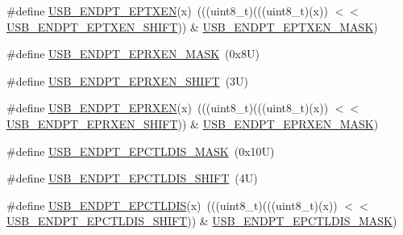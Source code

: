 \begin{DoxyCompactItemize}
\item 
\#define \mbox{\hyperlink{group___u_s_b___register___masks_gae2e26d86dd1195cd8536e873faa1c5e7}{U\+S\+B\+\_\+\+E\+N\+D\+P\+T\+\_\+\+E\+P\+T\+X\+EN}}(x)~(((uint8\+\_\+t)(((uint8\+\_\+t)(x)) $<$$<$ \mbox{\hyperlink{group___u_s_b___register___masks_gad281aa3cd601a2a93f60e0145dd8e564}{U\+S\+B\+\_\+\+E\+N\+D\+P\+T\+\_\+\+E\+P\+T\+X\+E\+N\+\_\+\+S\+H\+I\+FT}})) \& \mbox{\hyperlink{group___u_s_b___register___masks_ga3d498f31497071c5ff6ad30e89b7c26e}{U\+S\+B\+\_\+\+E\+N\+D\+P\+T\+\_\+\+E\+P\+T\+X\+E\+N\+\_\+\+M\+A\+SK}})
\item 
\#define \mbox{\hyperlink{group___u_s_b___register___masks_ga80f33455bd11aa0be5cd5d876ab48228}{U\+S\+B\+\_\+\+E\+N\+D\+P\+T\+\_\+\+E\+P\+R\+X\+E\+N\+\_\+\+M\+A\+SK}}~(0x8\+U)
\item 
\#define \mbox{\hyperlink{group___u_s_b___register___masks_gaeba041e492aca9bfbdbc90584e00cba9}{U\+S\+B\+\_\+\+E\+N\+D\+P\+T\+\_\+\+E\+P\+R\+X\+E\+N\+\_\+\+S\+H\+I\+FT}}~(3\+U)
\item 
\#define \mbox{\hyperlink{group___u_s_b___register___masks_ga88daead6b23836beafb0da6aead51fac}{U\+S\+B\+\_\+\+E\+N\+D\+P\+T\+\_\+\+E\+P\+R\+X\+EN}}(x)~(((uint8\+\_\+t)(((uint8\+\_\+t)(x)) $<$$<$ \mbox{\hyperlink{group___u_s_b___register___masks_gaeba041e492aca9bfbdbc90584e00cba9}{U\+S\+B\+\_\+\+E\+N\+D\+P\+T\+\_\+\+E\+P\+R\+X\+E\+N\+\_\+\+S\+H\+I\+FT}})) \& \mbox{\hyperlink{group___u_s_b___register___masks_ga80f33455bd11aa0be5cd5d876ab48228}{U\+S\+B\+\_\+\+E\+N\+D\+P\+T\+\_\+\+E\+P\+R\+X\+E\+N\+\_\+\+M\+A\+SK}})
\item 
\#define \mbox{\hyperlink{group___u_s_b___register___masks_ga07f43f2be7e974a763e86087f47e14d6}{U\+S\+B\+\_\+\+E\+N\+D\+P\+T\+\_\+\+E\+P\+C\+T\+L\+D\+I\+S\+\_\+\+M\+A\+SK}}~(0x10\+U)
\item 
\#define \mbox{\hyperlink{group___u_s_b___register___masks_ga0607b1ed419fd16c0c3635042ff33fd4}{U\+S\+B\+\_\+\+E\+N\+D\+P\+T\+\_\+\+E\+P\+C\+T\+L\+D\+I\+S\+\_\+\+S\+H\+I\+FT}}~(4\+U)
\item 
\#define \mbox{\hyperlink{group___u_s_b___register___masks_gacf7f8e35ddc1367ac4069ef47ccdd448}{U\+S\+B\+\_\+\+E\+N\+D\+P\+T\+\_\+\+E\+P\+C\+T\+L\+D\+IS}}(x)~(((uint8\+\_\+t)(((uint8\+\_\+t)(x)) $<$$<$ \mbox{\hyperlink{group___u_s_b___register___masks_ga0607b1ed419fd16c0c3635042ff33fd4}{U\+S\+B\+\_\+\+E\+N\+D\+P\+T\+\_\+\+E\+P\+C\+T\+L\+D\+I\+S\+\_\+\+S\+H\+I\+FT}})) \& \mbox{\hyperlink{group___u_s_b___register___masks_ga07f43f2be7e974a763e86087f47e14d6}{U\+S\+B\+\_\+\+E\+N\+D\+P\+T\+\_\+\+E\+P\+C\+T\+L\+D\+I\+S\+\_\+\+M\+A\+SK}})
$$
\end{DoxyCompactItemize}
